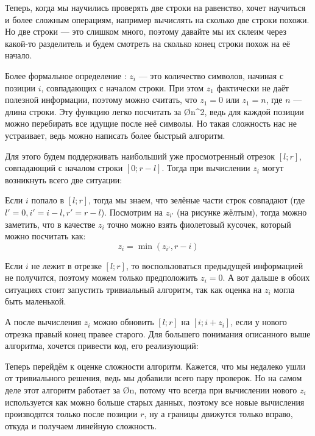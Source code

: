 Теперь, когда мы научились проверять две строки на равенство, хочет научиться и более сложным операциям, например вычислять на сколько две строки похожи. Но две строки — это слишком много, поэтому давайте мы их склеим через какой-то разделитель и будем смотреть на сколько конец строки похож на её начало.

Более формальное определение : $z_i$ — это количество символов, начиная с позиции $i$, совпадающих с началом строки. При этом $z_1$ фактически не даёт полезной информации, поэтому можно считать, что $z_1 = 0$ или $z_1 = n$, где $n$ — длина строки. Эту функцию легко посчитать за \O{n^2}, ведь для каждой позиции можно перебирать все идущие после неё символы. Но такая сложность нас не устраивает, ведь можно написать более быстрый алгоритм.

Для этого будем поддерживать наибольший уже просмотренный отрезок $[l; r]$, совпадающий с началом строки $[0; r - l]$. Тогда при вычислении $z_i$ могут возникнуть всего две ситуации:

\begin{wrapping}{0.34}
    Если $i$ попало в $[l; r]$, тогда мы знаем, что зелёные части строк совпадают (где $l' = 0, i' = i - l, r' = r - l$). Посмотрим на $z_{i'}$ (на рисунке жёлтым), тогда можно заметить, что в качестве $z_i$ точно можно взять фиолетовый кусочек, который можно посчитать как:
    $$z_i = \min(z_{i'}, r - i)$$
\end{wrapping}

Если $i$ не лежит в отрезке $[l; r]$, то воспользоваться предыдущей информацией не получится, поэтому можем только предположить $z_i = 0$. А вот дальше в обоих ситуациях стоит запустить тривиальный алгоритм, так как оценка на $z_i$ могла быть маленькой.

А после вычисления $z_i$ можно обновить $[l; r]$ на $[i; i + z_i]$, если у нового отрезка правый конец правее старого. Для большего понимания описанного выше алгоритма, хочется привести код, его реализующий:

\nocode

Теперь перейдём к оценке сложности алгоритм. Кажется, что мы недалеко ушли от тривиального решения, ведь мы добавили всего пару проверок. Но на самом деле этот алгоритм работает за \O{n}, потому что всегда при вычислении нового $z_i$ используется как можно больше старых данных, поэтому все новые вычисления производятся только после позиции $r$, ну а границы движутся только вправо, откуда и получаем линейную сложность.


